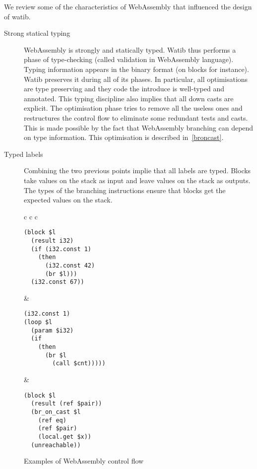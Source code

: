 \documentclass[10pt]{article}
\begin{document}
We review some of the characteristics of WebAssembly that influenced the design
of watib.

\begin{description}
\item[Strong statical typing] WebAssembly is strongly and statically typed.
  Watib thus performs a phase of type-checking (called validation in WebAssembly
  language). Typing information appears in the binary format (on blocks for
  instance). Watib preserves it during all of its phases. In particular, all
  optimisations are type preserving and they code the introduce is well-typed
  and annotated. This typing discipline also implies that all down casts are
  explicit. The optimisation phase tries to remove all the useless ones and
  restructures the control flow to eliminate some redundant tests and casts.
  This is made possible by the fact that WebAssembly branching can depend on
  type information. This optimisation is described in~\ref{broncast}.


\item[Typed labels]
Combining the two previous points implie that all labels are typed. Blocks take
values on the stack as input and leave values on the stack as outputs. The types
of the branching instructions ensure that blocks get the expected values on the
stack.
\end{description}
\begin{figure}[h]
\centering
\begin{tabular}{c c c}
\begin{minipage}{1.8in}
\begin{verbatim}
(block $l
  (result i32)
  (if (i32.const 1)
    (then
      (i32.const 42)
      (br $l)))
  (i32.const 67))
\end{verbatim}
\end{minipage}&
\begin{minipage}{1.8in}
\begin{verbatim}
(i32.const 1)
(loop $l
  (param $i32)
  (if
    (then
      (br $l
        (call $cnt)))))
\end{verbatim}
\end{minipage}
&\begin{minipage}{1.8in}
\begin{verbatim}
(block $l
  (result (ref $pair))
  (br_on_cast $l
    (ref eq)
    (ref $pair)
    (local.get $x))
  (unreachable))
\end{verbatim}
\end{minipage}
\end{tabular}
\caption{Examples of WebAssembly control flow}\label{cf-ex}
\end{figure}
\end{document}
